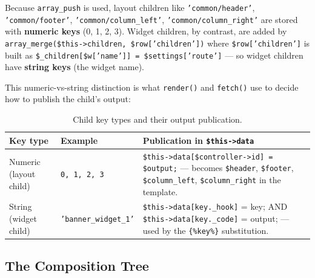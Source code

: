 \documentclass[11pt,a4paper]{article}
\begin{document}
Because \texttt{array\_push} is used, layout children like
\texttt{'common/header'}, \texttt{'common/footer'},
\texttt{'common/column\_left'}, \texttt{'common/column\_right'}
are stored with \textbf{numeric keys} (0, 1, 2, 3). Widget
children, by contrast, are added by
\texttt{array\_merge(\$this->children, \$row['children'])} where
\texttt{\$row['children']} is built as
\texttt{\$\_children[\$w['name']] = \$settings['route']} --- so
widget children have \textbf{string keys} (the widget name).

This numeric-vs-string distinction is what \texttt{render()} and
\texttt{fetch()} use to decide how to publish the child's output:

\begin{table}[htbp]
\centering
\caption{Child key types and their output publication.}\label{tab:child-keys}
\small
\begin{tabularx}{\columnwidth}{llX}
\toprule
\textbf{Key type} & \textbf{Example} & \textbf{Publication in \texttt{\$this->data}} \\
\midrule
Numeric (layout child) & \texttt{0, 1, 2, 3} & \texttt{\$this->data[\$controller->id] = \$output;} --- becomes \texttt{\$header}, \texttt{\$footer}, \texttt{\$column\_left}, \texttt{\$column\_right} in the template. \\
String (widget child) & \texttt{'banner\_widget\_1'} & \texttt{\$this->data[key.\_hook]} = key; AND \texttt{\$this->data[key.\_code]} = output; --- used by the \texttt{\{\%key\%\}} substitution. \\
\bottomrule
\end{tabularx}
\end{table}

\subsection{The Composition Tree}
\end{document}
